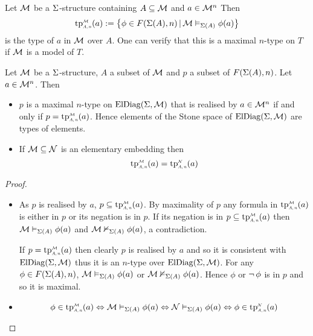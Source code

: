 \begin{dfn}
    Let $\mathcal{M}$ be a $\Sigma$-structure containing
    $A \subseteq {\mathcal{M}}$ and $a \in {\mathcal{M}}^n$
    Then 
    \[\subintp{A,n}{\MM}{\tp}(a) := 
    \set{\phi \in F(\Si(A),n) \st \MM \model{\Si(A)} \phi(a)}\]
    is the type of $a$ in $\mathcal{M}$ over $A$.
    One can verify that this is a maximal $n$-type on $T$
    if $\mathcal{M}$ is a model of $T$.
\end{dfn}

\begin{prop}
    Let $\mathcal{M}$ be a $\Sigma$-structure,
    $A$ a subset of ${\mathcal{M}}$ and $p$ a subset of $F(\Sigma(A),n)$.
    Let $a \in {\mathcal{M}}^n$.
    Then \begin{itemize}
        \item $p$ is a maximal $n$-type on $\mathrm{ElDiag}(\Sigma,\mathcal{M})$ 
            that is realised by $a \in {\mathcal{M}}^n$ 
            if and only if $p = \subintp{A,n}{\MM}{\tp}(a)$.
            Hence elements of the Stone space of $\mathrm{ElDiag}(\Sigma,\mathcal{M})$
            are types of elements.
        \item If $\mathcal{M} \subseteq \mathcal{N}$ is an elementary embedding then
            \[\subintp{A,n}{\MM}{\tp}(a) = \subintp{A,n}{\NN}{\tp}(a)\]
    \end{itemize}
\end{prop}
\begin{proof}~\begin{itemize}
    \item \begin{forward}
        As $p$ is realised by $a$, 
        $p \subs \subintp{A,n}{\MM}{\tp}(a)$.
        By maximality of $p$ any formula in $\subintp{A,n}{\MM}{\tp}(a)$ 
        is either in $p$
        or its negation is in $p$.
        If its negation is in 
        $p \subs \subintp{A,n}{\MM}{\tp}(a)$ 
        then $\mathcal{M} \vDash_{\Sigma(A)} \phi(a)$ and
        $\mathcal{M} \nvDash_{\Sigma(A)} \phi(a)$, a contradiction.
    \end{forward}
    \begin{backward}
        If $p = \subintp{A,n}{\MM}{\tp}(a)$ 
        then clearly $p$ is realised by $a$ and so it is consistent with 
        $\mathrm{ElDiag}(\Sigma,\mathcal{M})$ thus it is an $n$-type over $\mathrm{ElDiag}(\Sigma,\mathcal{M})$.
        For any $\phi \in F(\Sigma(A),n)$,
        $\mathcal{M} \vDash_{\Sigma(A)} \phi(a)$ or $\mathcal{M} \nvDash_{\Sigma(A)} \phi(a)$.
        Hence $\phi$ or $\neg\, \phi$ is in $p$ and so it is maximal.
    \end{backward}
    \item \[\phi \in \subintp{A,n}{\MM}{\tp}(a) \iff \MM \model{\Si(A)} \phi(a)
        \iff \NN \model{\Si(A)} \phi(a) \iff 
        \phi \in \subintp{A,n}{\NN}{\tp}(a)\]
\end{itemize}
\end{proof}